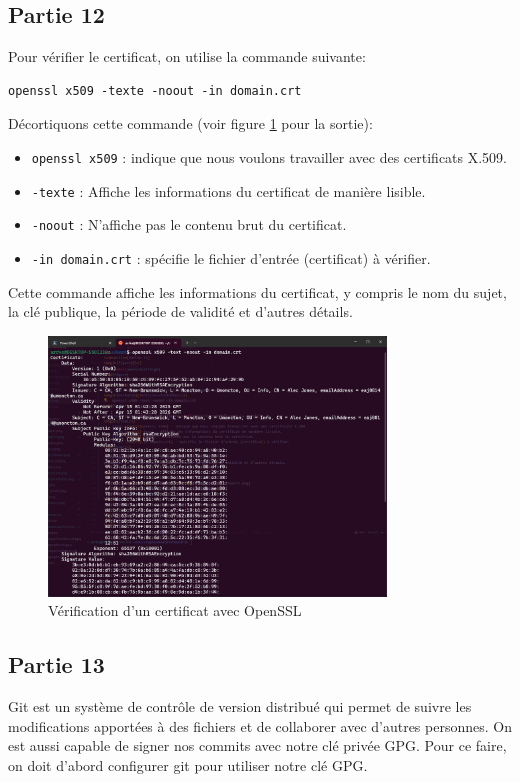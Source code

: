 \documentclass[12pt,a4paper]{article}
\begin{document}
\subsection{Partie 12}
Pour vérifier le certificat, on utilise la commande suivante:
\begin{Verbatim}[fontsize=\footnotesize]
    openssl x509 -texte -noout -in domain.crt
\end{Verbatim}

Décortiquons cette commande (voir figure \ref{opensslCertVerif} pour la sortie):
\begin{itemize}
    \item \texttt{openssl x509} : indique que nous voulons travailler avec des certificats X.509.
    \item \texttt{-texte} : Affiche les informations du certificat de manière lisible.
    \item \texttt{-noout} : N'affiche pas le contenu brut du certificat.
    \item \texttt{-in domain.crt} : spécifie le fichier d'entrée (certificat) à vérifier.
\end{itemize}

Cette commande affiche les informations du certificat,
y compris le nom du sujet, la clé publique, la période de validité et d'autres détails.

\begin{figure}[ht]
    \centering
    \includegraphics[width=0.8\textwidth]{../img/opensslCertVerif.png}
    \caption{Vérification d'un certificat avec OpenSSL}
    \label{opensslCertVerif}
\end{figure}

\subsection{Partie 13}
Git est un système de contrôle de version distribué qui permet de suivre
les modifications apportées à des fichiers et de collaborer avec d'autres personnes.
On est aussi capable de signer nos commits avec notre clé privée GPG.
Pour ce faire, on doit d'abord configurer git pour utiliser notre clé GPG.
\end{document}
